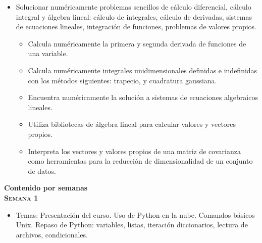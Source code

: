 \documentclass[letterpaper,10pt,onecolumn]{article}
\begin{document}
\begin{itemize}
\item Solucionar numéricamente problemas sencillos de cálculo
  diferencial, cálculo integral y álgebra lineal: cálculo de
  integrales, cálculo de derivadas, sistemas de ecuaciones lineales,
  integraci\'on de funciones, problemas de valores propios. \\[-0.6cm]   

\begin{itemize}
    \item Calcula num\'ericamente la primera y segunda derivada de
      funciones de una variable. 
    \item Calcula num\'ericamente integrales unidimensionales
      definidas e indefinidas con los m\'etodos siguientes: trapecio,
      y cuadratura gaussiana. 
    \item Encuentra num\'ericamente la soluci\'on a sistemas de
      ecuaciones algebraicos lineales. 
    \item Utiliza bibliotecas de \'algebra lineal para calcular
      valores y vectores propios. 
    \item Interpreta los vectores y valores propios de una matriz de
      covarianza como herramientas para la reducci\'on de
      dimensionalidad de un conjunto de datos. 
\end{itemize}
\end{itemize}

\vspace*{0.5cm} 

\noindent\textbf{\large {} \quad Contenido por
  semanas}\\[-0.2cm]  


\noindent\textbf{\textsc{Semana 1}}\\[-0.5cm]
\begin{itemize}
\item Temas: 
Presentaci\'on del curso. Uso de Python en la nube. Comandos b\'asicos Unix. 
Repaso de Python: variables, listas, iteraci\'on diccionarios, lectura
de archivos, condicionales.\\[-0.6cm] 
\end{itemize}
\end{document}
